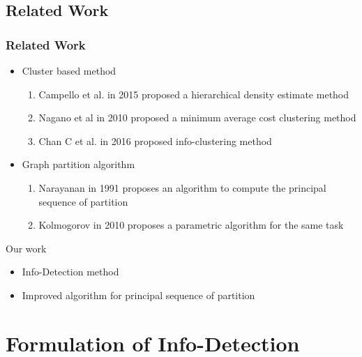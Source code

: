 \documentclass[notheorems]{beamer}
\begin{document}
\subsection{Related Work}
\begin{frame}
	\frametitle{Related Work}
\begin{itemize}
\item Cluster based method
	\begin{enumerate}
		\item Campello et al. in 2015 proposed a hierarchical density estimate method \cite{RN432}
		\item Nagano et al in 2010 proposed a minimum average cost clustering method \cite{mac}
		\item Chan C et al. in 2016 proposed info-clustering method \cite{ic}
	\end{enumerate}
\item Graph partition algorithm
\begin{enumerate}
\item Narayanan in 1991 proposes an algorithm to compute the principal sequence of partition \cite{psp}
\item Kolmogorov in 2010 proposes a parametric algorithm for the same task \cite{pmf}
\end{enumerate}
\end{itemize}
Our work
\begin{itemize}
\item Info-Detection method
\item Improved algorithm for principal sequence of partition
\end{itemize}
\end{frame}
\section{Formulation of Info-Detection}
\end{document}
